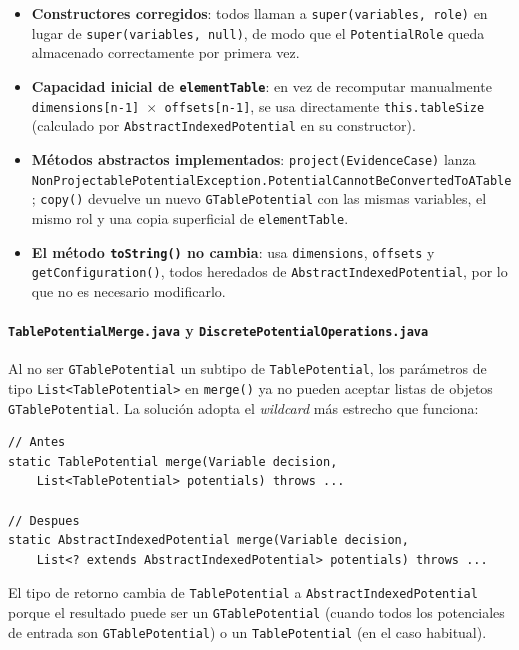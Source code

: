 \documentclass[11pt,a4paper]{article}
\newcommand{\code}[1]{\texttt{#1}}
\begin{document}
\begin{itemize}
  \item \textbf{Constructores corregidos}: todos llaman a \code{super(variables,\,role)}
        en lugar de \code{super(variables,\,null)}, de modo que el \code{PotentialRole}
        queda almacenado correctamente por primera vez.
  \item \textbf{Capacidad inicial de \code{elementTable}}: en vez de recomputar
        manualmente \code{dimensions[n{-}1] $\times$ offsets[n{-}1]}, se usa
        directamente \code{this.tableSize} (calculado por
        \code{Abstract\-Indexed\-Potential} en su constructor).
  \item \textbf{Métodos abstractos implementados}: \code{project(\-EvidenceCase)} lanza
        \code{Non\-Projectable\-Potential\-Exception.\-Potential\-Cannot\-Be\-Converted\-To\-A\-Table};
        \code{copy()} devuelve un nuevo \code{GTablePotential} con las mismas
        variables, el mismo rol y una copia superficial de \code{elementTable}.
  \item \textbf{El método \code{toString()} no cambia}: usa \code{dimensions},
        \code{offsets} y \code{getConfiguration()}, todos heredados de
        \code{AbstractIndexedPotential}, por lo que no es necesario modificarlo.
\end{itemize}

\paragraph{\code{TablePotentialMerge.java} y \code{DiscretePotentialOperations.java}}

Al no ser \code{GTablePotential} un subtipo de \code{TablePotential}, los parámetros
de tipo \code{List<TablePotential>} en \code{merge()} ya no pueden aceptar listas de
objetos \code{GTablePotential}.  La solución adopta el \emph{wildcard} más estrecho
que funciona:

\begin{lstlisting}[caption={Firma anterior y nueva de \texttt{merge()}}]
// Antes
static TablePotential merge(Variable decision,
    List<TablePotential> potentials) throws ...

// Despues
static AbstractIndexedPotential merge(Variable decision,
    List<? extends AbstractIndexedPotential> potentials) throws ...
\end{lstlisting}

El tipo de retorno cambia de \code{TablePotential} a \code{AbstractIndexedPotential}
porque el resultado puede ser un \code{GTablePotential} (cuando todos los potenciales
de entrada son \code{GTablePotential}) o un \code{TablePotential} (en el caso habitual).
\end{document}
